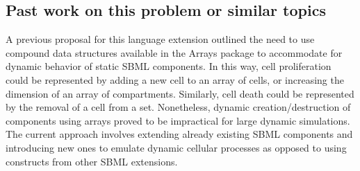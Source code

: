 \subsection{ Past work on this problem or similar topics }
\label{subsec:pastWork}

A previous proposal for this language extension outlined the need to use compound data structures available in the Arrays package to accommodate for dynamic behavior of static SBML components. In this way, cell proliferation could be represented by adding a new cell to an array of cells, or increasing the dimension of an array of compartments. Similarly, cell death could be represented by the removal of a cell from a set. Nonetheless, dynamic creation/destruction of components using arrays proved to be impractical for large dynamic simulations. The current approach involves extending already existing SBML components and introducing new ones to emulate dynamic cellular processes as opposed to using constructs from other SBML extensions.
		

